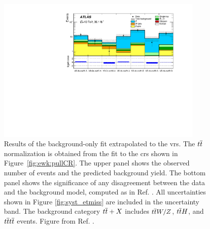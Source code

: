 \begin{figure}[htbp]
	\centering
	\includegraphics[width=0.9\textwidth]{figures/ewk_prod/etmiss_results/histpull_pulls_in_VR_qcdStrong}
	\caption{Results of the background-only fit extrapolated to the \glspl{vr}. 
	    The $t\overline{t}$ normalization is obtained from the fit to the \glspl{cr} shown in Figure~\ref{fig:ewk:pullCR}. The upper panel shows 
		the observed number of events and the predicted background yield. The bottom panel shows the significance of any disagreement between the data and the background model, computed as in Ref. \cite{Choudalakis:2011okv}.
		All uncertainties  shown in Figure \ref{fig:syst_etmiss} are included in the 
		uncertainty band. The background category $t\overline{t}+X$ includes $t\overline{t} W/Z$, 
		$t\overline{t} H$, and $t\overline{t} t\overline{t}$ events. Figure from Ref. \cite{Aaboud:2018htj}.}
	\label{fig:ewk:pullVR}
\end{figure}

